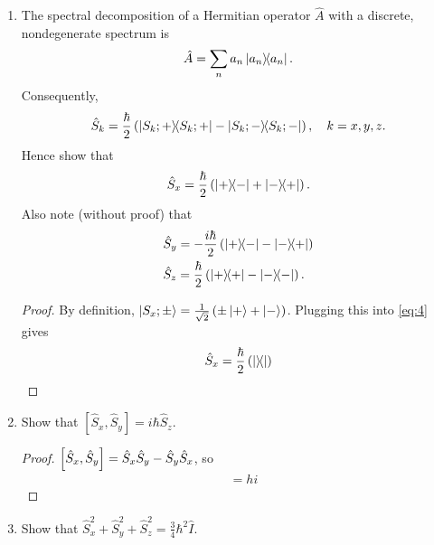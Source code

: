\documentclass[12pt]{article}
\newenvironment{problem}[2][Problem]{\begin{trivlist}
    \item[\hskip \labelsep {\bfseries #1}\hskip \labelsep {\bfseries #2.}]}{\end{trivlist}}
\theoremstyle{definition}
\begin{document}
\begin{problem}{3}
\begin{enumerate}[label=(\alph*)]
\begin{proof}
            Now, \( \ip{S_x; +}{S_x; -} = \frac{1}{2} \left( -\ip{+} + \ip{-} \right) = \frac{1}{2}(1-1) = 0\).
            Similarly, \( \ip{S_x; -}{S_x; +} = \frac{1}{2} \left( -\ip{+} + \ip{-} \right) = 0 \), as desired.
          \end{proof}
    \item The spectral decomposition of a Hermitian operator \( \hat{A} \) with a discrete, nondegenerate spectrum is
          \begin{equation}
          \label{eq:3}
          \hat{A} = \sum\limits_n a_n \op{a_n}.
          \end{equation}
          Consequently,
          \begin{equation}
          \label{eq:4}
          \hat{S}_k = \frac{\hbar}{2} \left( \op{S_k; +} - \op{S_k; -} \right), \quad k = x,y,z.
          \end{equation}
          Hence show that
          \begin{equation}
          \label{eq:5}
          \hat{S}_x = \frac{\hbar}{2} \left( \op{+}{-} + \op{-}{+} \right).
          \end{equation}
          Also note (without proof) that
          \begin{align}
          \label{eq:13}
            &\hat{S}_y = - \frac{i \hbar}{2} \left( \op{+}{-} - \op{-}{+} \right) \\
            &\hat{S}_z = \frac{\hbar}{2} \left( \op{+} - \op{-} \right).
          \end{align}
          \begin{proof}
            By definition, \( \ket{S_x; \pm} = \frac{1}{\sqrt{2}} \left( \pm \ket{+} + \ket{-} \right) \). Plugging this into \cref{eq:4} gives
            \begin{equation}
            \label{eq:12}
            \hat{S}_x = \frac{\hbar}{2} \left( \op{} \right)
            \end{equation}
          \end{proof}
    \item Show that \( \left[ \hat{S}_x, \hat{S}_y \right] = i \hbar \hat{S}_z\).
          \begin{proof}
            \( \comm{\hat{S}_x}{\hat{S}_y} = \hat{S}_x \hat{S}_y - \hat{S}_y \hat{S}_x \), so
            \begin{align}
            \label{eq:14}
              & = hi
            \end{align}
          \end{proof}
          \item Show that \( \hat{S}_x^2 + \hat{S}_y^2 + \hat{S}_z^2 = \frac{3}{4}\hbar^2 \hat{I} \).
  \end{enumerate}
\end{problem}
\end{document}
